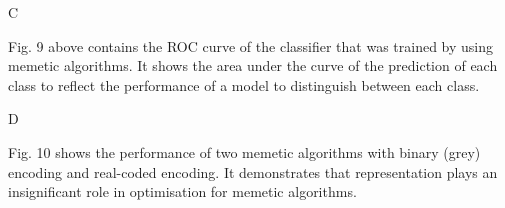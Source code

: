 \documentclass[conference]{IEEEtran}
\begin{document}
C
\\
\vspace{-1em}
\begin{figure}[!ht]

\centering{}

\caption{}
\label{fig:cnnj}
\end{figure}
\par
\noindent
Fig. 9 above contains the ROC curve of the classifier that was trained by using memetic algorithms. It shows the area under the curve of the prediction of each class to reflect the performance of a model to distinguish between each class.\\ 
\par
D
\begin{figure}[!ht]

\centering{}

\caption{}
\label{fig:cnnj}
\end{figure}
\par
\noindent
Fig. 10 shows the performance of two memetic algorithms with binary (grey) encoding and real-coded encoding. It demonstrates that representation plays an insignificant role in optimisation for memetic algorithms.
\\
\end{document}
